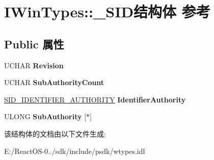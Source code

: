 \hypertarget{struct_i_win_types_1_1___s_i_d}{}\section{I\+Win\+Types\+:\+:\+\_\+\+S\+I\+D结构体 参考}
\label{struct_i_win_types_1_1___s_i_d}
\subsection*{Public 属性}
\begin{DoxyCompactItemize}
\item 
\mbox{\label{struct_i_win_types_1_1___s_i_d_a177312a99bba97cafbdfe3bc62875a33}} 
U\+C\+H\+AR {\bfseries Revision}
\item 
\mbox{\label{struct_i_win_types_1_1___s_i_d_af676c4554b04beb17bc14e6b976c64d8}} 
U\+C\+H\+AR {\bfseries Sub\+Authority\+Count}
\item 
\mbox{\label{struct_i_win_types_1_1___s_i_d_ad6cd594184506ae7556ef4563c9171fe}} 
\hyperlink{struct_i_win_types_1_1___s_i_d___i_d_e_n_t_i_f_i_e_r___a_u_t_h_o_r_i_t_y}{S\+I\+D\+\_\+\+I\+D\+E\+N\+T\+I\+F\+I\+E\+R\+\_\+\+A\+U\+T\+H\+O\+R\+I\+TY} {\bfseries Identifier\+Authority}
\item 
\mbox{\label{struct_i_win_types_1_1___s_i_d_a0adf891779f65002cb6637b401d72eac}} 
U\+L\+O\+NG {\bfseries Sub\+Authority} \mbox{[}$\ast$\mbox{]}
\end{DoxyCompactItemize}


该结构体的文档由以下文件生成\+:\begin{DoxyCompactItemize}
\item 
E\+:/\+React\+O\+S-\/0../sdk/include/psdk/wtypes.\+idl\end{DoxyCompactItemize}
